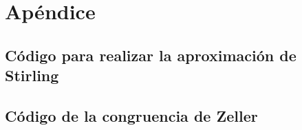 \section{Apéndice}

\subsection{Código para realizar la aproximación de Stirling}


\pagebreak
\subsection{Código de la congruencia de Zeller} \label{sec:zeller}


